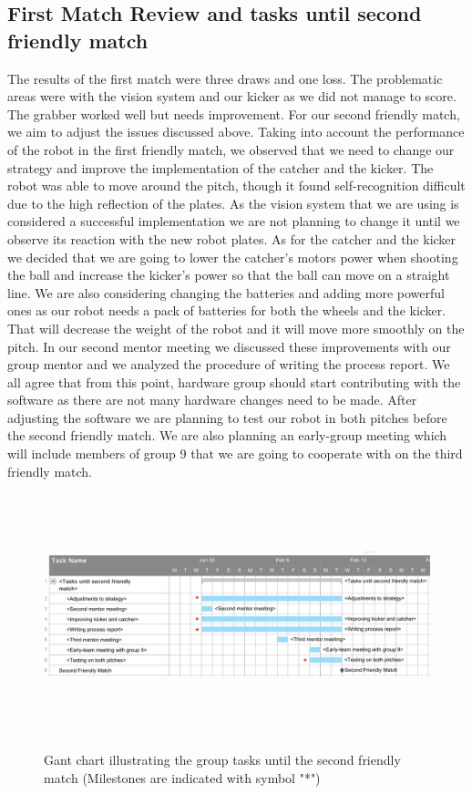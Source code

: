 \documentclass{article}
\begin{document}
\subsection{First Match Review and tasks until second friendly match}
The results of the first match were three draws and one loss. The problematic
areas were with the vision system and our kicker as we did not manage to score.
The grabber worked well but needs improvement. For our second friendly match, we
aim to adjust the issues discussed above. Taking into account the performance of
the robot in the first friendly match, we observed that we need to change our
strategy and improve the implementation of the catcher and the kicker. The robot
was able to move around the pitch, though it found self-recognition difficult
due to the high reflection of the plates. As the vision system that we are using
is considered a successful implementation we are not planning to change it until
we observe its reaction with the new robot plates. As for the catcher and the
kicker we decided that we are going to lower the catcher's motors power when
shooting the ball and increase the kicker's power so that the ball can move on a
straight line. We are also considering changing the batteries and adding more
powerful ones as our robot needs a pack of batteries for both the wheels and the
kicker. That will decrease the weight of the robot and it will move more
smoothly on the pitch. In our second mentor meeting we discussed these
improvements with our group mentor and we analyzed the procedure of writing the
process report. We all agree that from this point, hardware group should start
contributing with the software as there are not many hardware changes need to be
made. After adjusting the software we are planning to test our robot in both
pitches before the second friendly match. We are also planning an early-group
meeting which will include members of group 9 that we are going to cooperate
with on the third friendly match.

\begin{figure}[H]
	\centering
	\begin{minipage}{1\textwidth}
		\centering
		\includegraphics[width=16cm, height=7cm]{SecondFriendlyMatch.png}\\
		\caption{Gant chart illustrating the group tasks until the second friendly match (Milestones are indicated with symbol "*")}
	\end{minipage}%
\end{figure}
\end{document}
